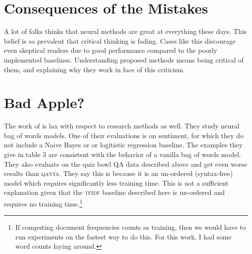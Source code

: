 \documentclass[12pt]{article}
\begin{document}





\section{Consequences of the Mistakes}
A lot of folks thinks that neural methods are great at everything these days.
This belief is so prevalent that critical thinking is fading.
Cases like this discourage even skeptical readers due to good performance
compared to the poorly implemented baselines.
Understanding proposed methods means being critical of them,
and explaining why they work in face of this criticism.


\section{Bad Apple?}
The work of  is lax with respect to
research methods as well.
They study neural bag of words models.
One of their evaluations is on sentiment, for which they do
not include a Naive Bayes or or logitistic regression baseline.
The examples they give in table 3 are consistent with the
behavior of a vanilla bag of words model.
They also evaluate on the quiz bowl QA data described above
and get even worse results than \textsc{qanta}.
They say this is because it is an un-ordered (syntax-free)
model which requires significantly less training time.
This is not a sufficient explanation given that the \textsc{tfidf}
baseline described here is un-ordered and requires no
training time.\footnote{If computing document frequencies
counts as training, then we would have to run experiments
on the fastest way to do this. For this work, I had some word
counts laying around.}




\end{document}
